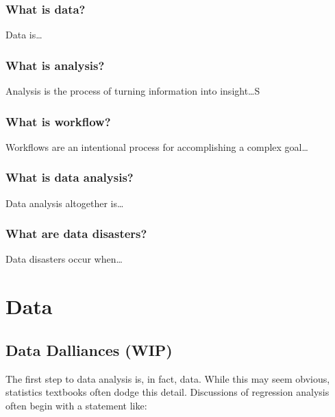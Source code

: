 \documentclass[
]{krantz}
\begin{document}
\hypertarget{what-is-data}{%
\section{What is data?}\label{what-is-data}}

Data is\ldots{}

\hypertarget{what-is-analysis}{%
\section{What is analysis?}\label{what-is-analysis}}

Analysis is the process of turning information into insight\ldots S

\hypertarget{what-is-workflow}{%
\section{What is workflow?}\label{what-is-workflow}}

Workflows are an intentional process for accomplishing a complex goal\ldots{}

\hypertarget{what-is-data-analysis}{%
\section{What is data analysis?}\label{what-is-data-analysis}}

Data analysis altogether is\ldots{}

\hypertarget{what-are-data-disasters}{%
\section{What are data disasters?}\label{what-are-data-disasters}}

Data disasters occur when\ldots{}

\hypertarget{part-data}{%
\part*{Data}\label{part-data}}


\hypertarget{data-dall}{%
\chapter{Data Dalliances (WIP)}\label{data-dall}}

The first step to data analysis is, in fact, data. While this may seem obvious, statistics textbooks often dodge this detail.
Discussions of regression analysis often begin with a statement like:
\end{document}
